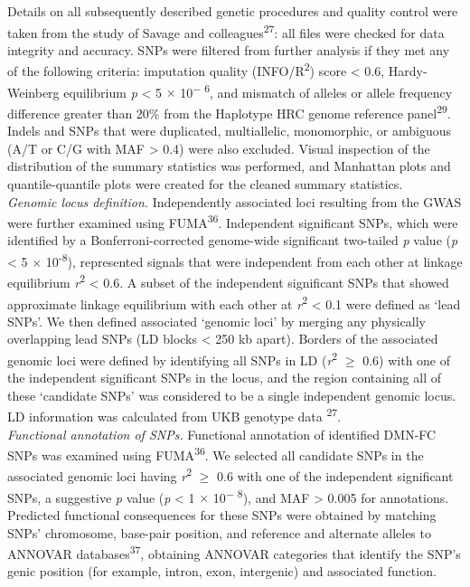 \begin{refsection}
Details on all subsequently described genetic procedures and quality control were taken from the study of Savage and colleagues\textsuperscript{27}: all files were checked for data integrity and accuracy. SNPs were filtered from further analysis if they met any of the following criteria: imputation quality (INFO/R\textsuperscript{2}) score < 0.6, Hardy-Weinberg equilibrium \textit{p} < 5 $ \times $  10\textsuperscript{$-$ 6}, and mismatch of alleles or allele frequency difference greater than 20$\%$  from the Haplotype HRC genome reference panel\textsuperscript{29}. Indels and SNPs that were duplicated, multiallelic, monomorphic, or ambiguous (A/T or C/G with MAF > 0.4) were also excluded. Visual inspection of the distribution of the summary statistics was performed, and Manhattan plots and quantile-quantile plots were created for the cleaned summary statistics.\\

\noindent
\textit{Genomic locus definition. }Independently associated loci resulting from the GWAS were further examined using FUMA\textsuperscript{36}. Independent significant SNPs, which were identified by a Bonferroni-corrected genome-wide significant two-tailed \textit{p} value (\textit{p} < 5 $ \times $ 10\textsuperscript{-8}), represented signals that were independent from each other at linkage equilibrium \textit{r}\textsuperscript{2} < 0.6. A subset of the independent significant SNPs that showed approximate linkage equilibrium with each other at \textit{r}\textsuperscript{2} < 0.1 were defined as ‘lead SNPs’. We then defined associated ‘genomic loci’ by merging any physically overlapping lead SNPs (LD blocks < 250 kb apart). Borders of the associated genomic loci were defined by identifying all SNPs in LD (\textit{r}\textsuperscript{2} $ \geq $  0.6) with one of the independent significant SNPs in the locus, and the region containing all of these ‘candidate SNPs’ was considered to be a single independent genomic locus. LD information was calculated from UKB genotype data \textsuperscript{27}.\\

\noindent
\textit{Functional annotation of SNPs.} Functional annotation of identified DMN-FC SNPs was examined using FUMA\textsuperscript{36}. We selected all candidate SNPs in the associated genomic loci having \textit{r}\textsuperscript{2} $ \geq $  0.6 with one of the independent significant SNPs, a suggestive \textit{p} value (\textit{p} < 1 $ \times $  10\textsuperscript{$-$ 8}), and MAF > 0.005 for annotations. Predicted functional consequences for these SNPs were obtained by matching SNPs’ chromosome, base-pair position, and reference and alternate alleles to ANNOVAR databases\textsuperscript{37}, obtaining ANNOVAR categories that identify the SNP’s genic position (for example, intron, exon, intergenic) and associated function.\\


\end{refsection}
